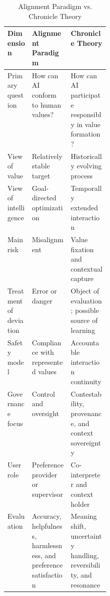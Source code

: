 \begin{table}[H]
\centering
\caption{Alignment Paradigm vs. Chronicle Theory}
\label{tab:alignment-vs-chronicle}
\begin{tabularx}{\linewidth}{>{\raggedright\arraybackslash}p{0.24\linewidth}XX}
\toprule
\textbf{Dimension} & \textbf{Alignment Paradigm} & \textbf{Chronicle Theory} \\
\midrule
Primary question & How can AI conform to human values? & How can AI participate responsibly in value formation? \\
View of value & Relatively stable target & Historically evolving process \\
View of intelligence & Goal-directed optimization & Temporally extended interaction \\
Main risk & Misalignment & Value fixation and contextual capture \\
Treatment of deviation & Error or danger & Object of evaluation; possible source of learning \\
Safety model & Compliance with represented values & Accountable interaction continuity \\
Governance focus & Control and oversight & Contestability, provenance, and context sovereignty \\
User role & Preference provider or supervisor & Co-interpreter and context holder \\
Evaluation & Accuracy, helpfulness, harmlessness, and preference satisfaction & Meaning shift, uncertainty handling, reversibility, and resonance \\
\bottomrule
\end{tabularx}
\end{table}
